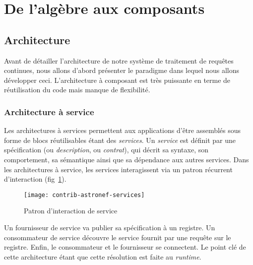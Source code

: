 \section{De l'algèbre aux composants}\label{sec:contrib:astronef:architecture}
\subsection{Architecture}
Avant de détailler l'architecture de notre système de traitement de requêtes continues, nous allons d'abord présenter le paradigme dans lequel nous allons développer ceci. L'architecture à composant est très puissante en terme de réutilisation du code mais manque de flexibilité. 
\subsubsection{Architecture à service}
Les architectures à services permettent aux applications d'être assemblés sous forme de blocs réutilisables étant des \textit{services}. Un \textit{service} est définit par une spécification (ou \textit{description}, ou \textit{contrat}), qui décrit sa syntaxe, son comportement, sa sémantique ainsi que sa dépendance aux autres services. Dans les architectures à service, les services interagissent via un patron récurrent d'interaction (fig~\ref{fig:contrib:astronef:services}). 
\begin{figure}[ht]
    \centering
    \texttt{[image: contrib-astronef-services]}
    \caption{Patron d'interaction de service}\label{fig:contrib:astronef:services}
\end{figure}
Un fournisseur de service va publier sa spécification à un registre. Un consommateur de service découvre le service fournit par une requête sur le registre. Enfin, le consommateur et le fournisseur se connectent. Le point clé de cette architecture étant que cette résolution est faite au \textit{runtime}.

